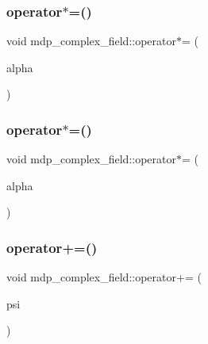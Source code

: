 \mbox{\label{classmdp__complex__field_a530256e46fe46c7422cbba8381891636}} 
\subsubsection{\texorpdfstring{operator$\ast$=()}{operator*=()}\hspace{0.1cm}{\footnotesize\ttfamily [1/2]}}
{\footnotesize\ttfamily void mdp\+\_\+complex\+\_\+field\+::operator$\ast$= (\begin{DoxyParamCaption}\item[{const \hyperlink{classmdp__complex}{mdp\+\_\+complex}}]{alpha }\end{DoxyParamCaption})\hspace{0.3cm}{\ttfamily [inline]}}

\mbox{\label{classmdp__complex__field_af890e25006822910f411ce10ba7dfc7a}} 
\subsubsection{\texorpdfstring{operator$\ast$=()}{operator*=()}\hspace{0.1cm}{\footnotesize\ttfamily [2/2]}}
{\footnotesize\ttfamily void mdp\+\_\+complex\+\_\+field\+::operator$\ast$= (\begin{DoxyParamCaption}\item[{const \hyperlink{mdp__global__vars_8h_a69d96b74c791e0bbdb888b3913a69450}{mdp\+\_\+real}}]{alpha }\end{DoxyParamCaption})\hspace{0.3cm}{\ttfamily [inline]}}

\mbox{\label{classmdp__complex__field_a2278eac1ee19b8ca1c3c6b7319f6525d}} 
\subsubsection{\texorpdfstring{operator+=()}{operator+=()}}
{\footnotesize\ttfamily void mdp\+\_\+complex\+\_\+field\+::operator+= (\begin{DoxyParamCaption}\item[{\hyperlink{classmdp__complex__field}{mdp\+\_\+complex\+\_\+field} \&}]{psi }\end{DoxyParamCaption})\hspace{0.3cm}{\ttfamily [inline]}}


